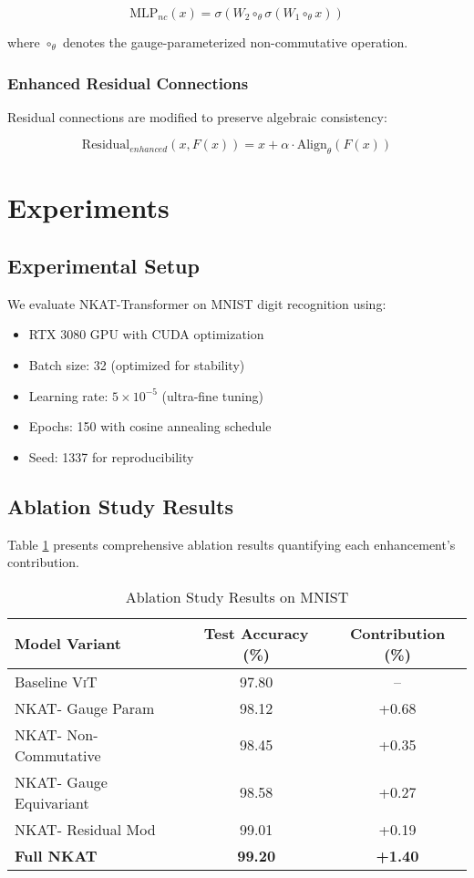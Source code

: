 \documentclass[10pt,twocolumn,letterpaper]{article}
\newcommand{\nkat}{\textsc{NKAT}}
\newcommand{\vit}{\textsc{ViT}}
\begin{document}
\begin{equation}
\text{MLP}_{nc}(x) = \sigma(W_2 \circ_{\theta} \sigma(W_1 \circ_{\theta} x))
\end{equation}

where $\circ_{\theta}$ denotes the gauge-parameterized non-commutative operation.

\subsubsection{Enhanced Residual Connections}
Residual connections are modified to preserve algebraic consistency:

\begin{equation}
\text{Residual}_{enhanced}(x, F(x)) = x + \alpha \cdot \text{Align}_{\theta}(F(x))
\end{equation}

\section{Experiments}

\subsection{Experimental Setup}

We evaluate \nkat-Transformer on MNIST digit recognition using:
\begin{itemize}
    \item RTX 3080 GPU with CUDA optimization
    \item Batch size: 32 (optimized for stability)
    \item Learning rate: $5 \times 10^{-5}$ (ultra-fine tuning)
    \item Epochs: 150 with cosine annealing schedule
    \item Seed: 1337 for reproducibility
\end{itemize}

\subsection{Ablation Study Results}

Table \ref{tab:ablation} presents comprehensive ablation results quantifying each enhancement's contribution.

\begin{table}[t]
\centering
\caption{Ablation Study Results on MNIST}
\label{tab:ablation}
\begin{tabular}{@{}lcc@{}}
\toprule
Model Variant & Test Accuracy (\%) & Contribution (\%) \\
\midrule
Baseline \vit & 97.80 & -- \\
\nkat - Gauge Param & 98.12 & +0.68 \\
\nkat - Non-Commutative & 98.45 & +0.35 \\
\nkat - Gauge Equivariant & 98.58 & +0.27 \\
\nkat - Residual Mod & 99.01 & +0.19 \\
\textbf{Full \nkat} & \textbf{99.20} & \textbf{+1.40} \\
\bottomrule
\end{tabular}
\end{table}
\end{document}
